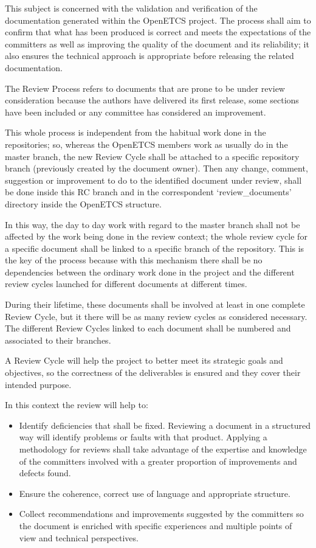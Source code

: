 \documentclass{template/openetcs_article}
\begin{document}
This subject is concerned with the validation and verification of the documentation generated within the OpenETCS project.  The process shall aim to confirm that what has been produced is correct and meets the expectations of the committers as well as improving the quality of the document and its reliability; it also ensures the technical approach is appropriate before releasing the related documentation.

The Review Process refers to documents that are prone to be under review consideration because the authors have delivered its first release, some sections have been included or any committee has considered an improvement. 

This whole process is independent from the habitual work done in the repositories; so, whereas the OpenETCS members work as usually do in the master branch, the new Review Cycle shall be attached to a specific repository branch (previously created by the document owner). Then any change, comment, suggestion or improvement to do to the identified document under review, shall be done inside this RC branch and in the correspondent ‘review\_documents’ directory inside the OpenETCS structure. 

In this way, the day to day work with regard to the master branch shall not be affected by the work being done in the review context; the whole review cycle for a specific document shall be linked to a specific branch of the repository. 
This is the key of the process because with this mechanism there shall be no dependencies between the ordinary work done in the project and the different review cycles launched for different documents at different times.

During their lifetime, these documents shall be involved at least in one complete Review Cycle, but it there will be as many review cycles as considered necessary. The different Review Cycles linked to each document shall be numbered and associated to their branches.   

A Review Cycle will help the project to better meet its strategic goals and objectives, so the correctness of the deliverables is ensured and they cover their intended purpose.

In this context the review will help to:
\begin{itemize}
\item Identify deficiencies that shall be fixed. Reviewing a document in a structured way will identify problems or faults with that product. Applying a methodology for reviews shall take advantage of the expertise and knowledge of the committers involved with a greater proportion of improvements and defects found.
\item Ensure the coherence, correct use of language and appropriate structure.
\item Collect recommendations and improvements suggested by the committers so the document is enriched with specific experiences and multiple points of view and technical perspectives.
\end{itemize}
\end{document}
